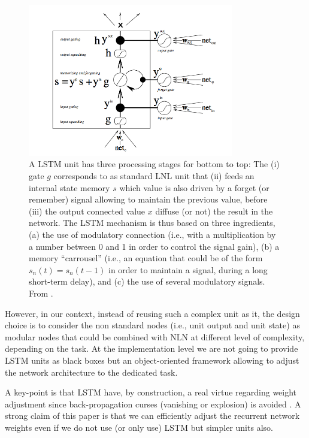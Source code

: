 \begin{figure}[!ht]
  \includegraphics[width=0.8\textwidth]{img/lstm-unit}
  \caption{A LSTM unit has three processing stages for bottom to top: The (i) gate $g$ corresponds to as standard LNL unit that (ii) feeds an internal state memory $s$ which value is also driven by a forget (or remember) signal allowing to maintain the previous value, before (iii) the output connected value $x$ diffuse (or not) the result in the network. The LSTM mechanism is thus based on three ingredients, (a) the use of modulatory connection (i.e., with a multiplication by a number between 0 and 1 in order to control the signal gain), (b) a memory ``carrousel'' (i.e., an equation that could be of the form $s_n(t) = s_n(t-1)$ in order to maintain a signal, during a long short-term delay), and (c) the use of several modulatory signals. From \cite{Hochreiter:1997}.}
  \label{lstm-unit}
\end{figure}

However, in our context, instead of reusing such a complex unit as it, the design choice is to consider the non standard nodes (i.e., unit output and unit state) as modular nodes that could be combined with NLN at different level of complexity, depending on the task. At the implementation level we are not going to provide LSTM units as black boxes but an object-oriented framework allowing to adjust the network architecture to the dedicated task.

A key-point is that LSTM have, by construction, a real virtue regarding weight adjustment since back-propagation curses (vanishing or explosion) is avoided \cite{Schmidhuber:2015}. A strong claim of this paper is that we can efficiently adjust the recurrent network weights even if we do not use (or only use) LSTM but simpler units also.

